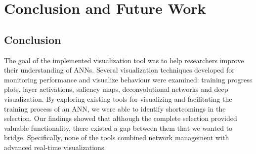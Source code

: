 
\chapter{Conclusion and Future Work}

\section{Conclusion} %






The goal of the implemented visualization tool was to help researchers improve their understanding of ANNs. Several visualization techniques developed for monitoring performance and visualize behaviour were examined: training progress plots, layer activations, saliency maps, deconvolutional networks and deep visualization. By exploring existing tools for visualizing and facilitating the training process of an ANN, we were able to identify shortcomings in the selection. Our findings showed that although the complete selection provided valuable functionality, there existed a gap between them that we wanted to bridge. Specifically, none of the tools combined network management with advanced real-time visualizations. \\

